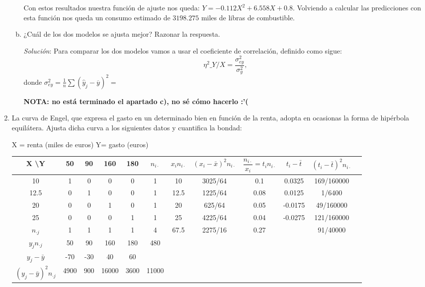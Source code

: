 \documentclass[10pt,a4paper]{article}
\begin{document}
\begin{enumerate}
\begin{enumerate}[a)]
Con estos resultados nuestra función de ajuste nos queda: \(Y = -0.112X^2 + 6.558X + 0.8\). Volviendo a calcular las predicciones con esta función nos queda un consumo estimado de \(3198.275\) miles de libras de combustible. 
\item ¿Cuál de los dos modelos se ajusta mejor? Razonar la respuesta.

\emph{Solución}: Para comparar los dos modelos vamos a usar el coeficiente de correlación, definido como sigue:
\[
\eta^2\_{Y/X}=\frac{\sigma_{ey}^2}{\sigma_y^2},
\]
donde \(\sigma_{ey}^2 = \frac{1}{n}\sum \left( \hat{y}_j-\overline{y}\right)^2=\)

\textbf{NOTA: no está terminado el apartado c), no sé cómo hacerlo :'(}
\end{enumerate}

\newpage
\item La curva de Engel, que expresa el gasto en un determinado bien en función de la renta, adopta en ocasionas la forma de hipérbola equilátera. Ajusta dicha curva a los siguientes datos y cuantifica la bondad:

X = renta (miles de euros) \hspace{0.5cm} Y= gasto (euros)

\vspace{0.25cm}
\setlength{\parindent}{0pt}
\begin{tabular}{|c|c|c|c|c|c|c|c|c|c|c|c|}
\hline 
X \textbackslash Y & 50 & 90 & 160 & 180 & $n_{i \cdot}$ & $x_i n_{i \cdot}$ & $(x_i - \bar{x})^2 n_{i \cdot}$ & $\dfrac{n_{i \cdot}}{x_i} = t_i n_{i \cdot}$ & $t_{i} - \bar{t}$ & $(t_{i} - \bar{t})^2 n_{i \cdot}$ \\ 
\hline 
10 & 1 & 0 & 0 & 0 & 1 & 10 & 3025/64 & 0.1 & 0.0325 & 169/160000 \\ 
\hline 
12.5 & 0 & 1 & 0 & 0 & 1 & 12.5 & 1225/64 & 0.08 & 0.0125 & 1/6400 \\ 
\hline 
20 & 0 & 0 & 1 & 0 & 1 & 20 & 625/64 & 0.05 & -0.0175 & 49/160000 \\ 
\hline 
25 & 0 & 0 & 0 & 1 & 1 & 25 & 4225/64 & 0.04 & -0.0275 & 121/160000 \\ 
\hline 
$n_{\cdot j}$ & 1 & 1 & 1 & 1 & 4 & 67.5 & 2275/16 & 0.27 &   & 91/40000 \\ 
\hline 
$y_{j}n_{\cdot j}$ & 50 & 90 & 160 & 180 & 480 &  &  &   &   &   \\ 
\hline 
$y_j - \bar{y}$ & -70 & -30 & 40 & 60 &   &   &   &  &   &   \\ 
\hline 
$(y_j - \bar{y})^2 n_{\cdot j}$ & 4900 & 900 & 16000 & 3600 & 11000 &  &   &   &   &   \\ 
\hline 
\end{tabular} 


\end{enumerate}
\end{document}
